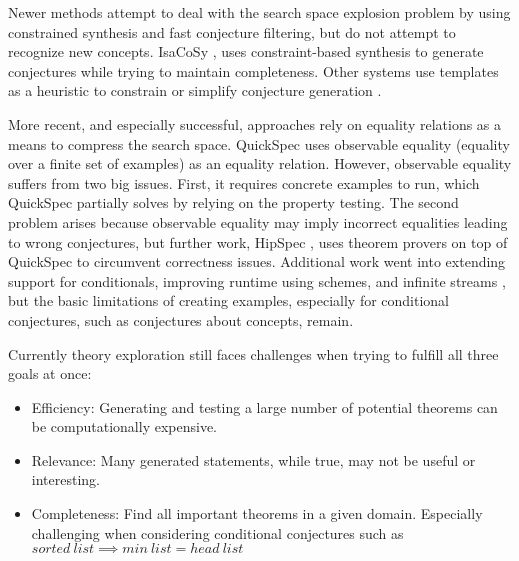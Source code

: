 Newer methods attempt to deal with the search space explosion problem by using constrained synthesis and fast conjecture filtering, but do not attempt to recognize new concepts.
IsaCoSy \cite{JAR2010:Johanssonisacosy}, uses constraint-based synthesis to generate conjectures while trying to maintain completeness.
Other systems use templates as a heuristic to constrain or simplify conjecture generation \cite{einarsdottir2020template,ESA2012:Montanoschemebased,mccasland2006mathsaid}. 

More recent, and especially successful, approaches rely on equality relations as a means to compress the search space.
QuickSpec \cite{} uses observable equality (equality over a finite set of examples) as an equality relation.
However, observable equality suffers from two big issues.
First, it requires concrete examples to run, which QuickSpec partially solves by relying on the property testing. 
The second problem arises because observable equality may imply incorrect equalities leading to wrong conjectures, but further work, HipSpec \cite{hipster}, uses theorem provers on top of QuickSpec to circumvent correctness issues.
Additional work went into extending support for conditionals, improving runtime using schemes, and infinite streams , but the basic limitations of creating examples, especially for conditional conjectures, such as conjectures about concepts, remain.

Currently theory exploration still faces challenges when trying to fulfill all three goals at once:
\begin{itemize}
    \item Efficiency: Generating and testing a large number of potential theorems can be computationally expensive.
    \item Relevance: Many generated statements, while true, may not be useful or interesting.
    \item Completeness: Find all important theorems in a given domain. Especially challenging when considering conditional conjectures such as $sorted~list \implies min~list = head~list$
\end{itemize}

